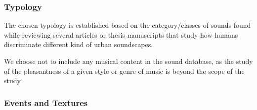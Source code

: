 \documentclass[preprint,12pt]{elsarticle}
\newcommand{\etc}{\emph{etc.}}
\begin{document}
\subsubsection*{Typology}



The chosen typology is established based on the category/classes of sounds found while reviewing several articles or thesis manuscripts \cite{maffiolo_caracterisation_1999,raimbault2002simulation,guastavino_etude_2003,defreville2004aactivity,raimbault2005urban,dubois2006cognitive,devergie_relations_2006,guastavino2006ideal,niessen2010categories,maffiolo_caracterisation_1999,beaumont2004pertinence,polack2008perceptive,leobon_analyse_1986,brown2011towards} that study how humans discriminate different kind of urban soundscapes.


We choose not to include any musical content in the sound database, as the study of the pleasantness of a given style or genre of music is beyond the scope of the study.

\subsubsection*{Events and Textures}

\end{document}
